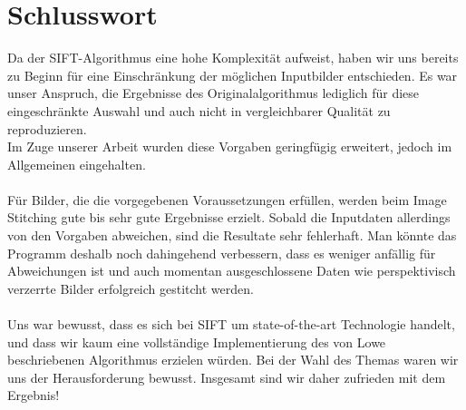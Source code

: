 \documentclass[deutsch]{scrartcl}
\begin{document}
\section{Schlusswort}
Da der SIFT-Algorithmus eine hohe Komplexität aufweist, haben wir uns bereits zu Beginn für eine Einschränkung der möglichen Inputbilder entschieden. Es war unser Anspruch, die Ergebnisse des Originalalgorithmus lediglich für diese eingeschränkte Auswahl und auch nicht in vergleichbarer Qualität zu reproduzieren. \\
Im Zuge unserer Arbeit wurden diese Vorgaben geringfügig erweitert, jedoch im Allgemeinen eingehalten.\\\\
Für Bilder, die die vorgegebenen Voraussetzungen erfüllen, werden beim Image Stitching gute bis sehr gute Ergebnisse erzielt. Sobald die Inputdaten allerdings von den Vorgaben abweichen, sind die Resultate sehr fehlerhaft. Man könnte das Programm deshalb noch dahingehend verbessern, dass es weniger anfällig für Abweichungen ist und auch momentan ausgeschlossene Daten wie perspektivisch verzerrte Bilder erfolgreich gestitcht werden.\\\\
Uns war bewusst, dass es sich bei SIFT um state-of-the-art Technologie handelt, und dass wir kaum eine vollständige Implementierung des von Lowe\cite{lowe04} beschriebenen Algorithmus erzielen würden. Bei der Wahl des Themas waren wir uns der Herausforderung bewusst. Insgesamt sind wir daher zufrieden mit dem Ergebnis!\\

\newpage


\end{document}
